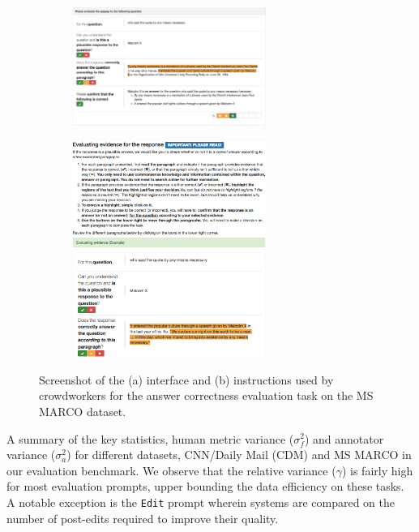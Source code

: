 \begin{figure}
  \begin{subfigure}{\textwidth}
    \centering
    \includegraphics[width=0.7\textwidth]{figures/msmarco_interface}
    \caption{\label{fig:price:msmarco-interface}}
  \end{subfigure}
  \begin{subfigure}{\textwidth}
    \centering
    \includegraphics[width=0.7\textwidth]{figures/msmarco_tutorial}
    \caption{\label{fig:price:msmarco-tutorial}}
  \end{subfigure}
  \caption{\label{fig:price:interfaces-qa}Screenshot of the (a) interface and (b) instructions used by crowdworkers for the answer correctness evaluation task on the MS MARCO dataset.}
\end{figure}


\begin{table}[t]
  \centering
  
  \caption[Key statistics of the data collected]{\label{tab:price:dataset} A summary of the key statistics, human metric variance ($\sigma^2_f$) and annotator variance ($\sigma^2_a$) for different datasets, CNN/Daily Mail (CDM) and MS MARCO in our evaluation benchmark.
  We observe that the relative variance ($\gamma$) is fairly high for most evaluation prompts, upper bounding the data efficiency on these tasks.
  A notable exception is the \texttt{Edit} prompt wherein systems are compared on the number of post-edits required to improve their quality.
  }
\end{table}

